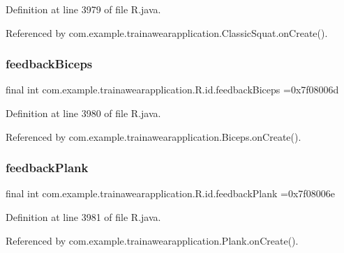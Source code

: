 Definition at line 3979 of file R.\+java.



Referenced by com.\+example.\+trainawearapplication.\+Classic\+Squat.\+on\+Create().

\mbox{\label{classcom_1_1example_1_1trainawearapplication_1_1_r_1_1id_a21482ba55a776d6d7ff586d43b728cf4}} 
\subsubsection{\texorpdfstring{feedbackBiceps}{feedbackBiceps}}
{\footnotesize\ttfamily final int com.\+example.\+trainawearapplication.\+R.\+id.\+feedback\+Biceps =0x7f08006d\hspace{0.3cm}{\ttfamily [static]}}



Definition at line 3980 of file R.\+java.



Referenced by com.\+example.\+trainawearapplication.\+Biceps.\+on\+Create().

\mbox{\label{classcom_1_1example_1_1trainawearapplication_1_1_r_1_1id_a4a49531b46a14e2ebfa83ef2568b4da0}} 
\subsubsection{\texorpdfstring{feedbackPlank}{feedbackPlank}}
{\footnotesize\ttfamily final int com.\+example.\+trainawearapplication.\+R.\+id.\+feedback\+Plank =0x7f08006e\hspace{0.3cm}{\ttfamily [static]}}



Definition at line 3981 of file R.\+java.



Referenced by com.\+example.\+trainawearapplication.\+Plank.\+on\+Create().

